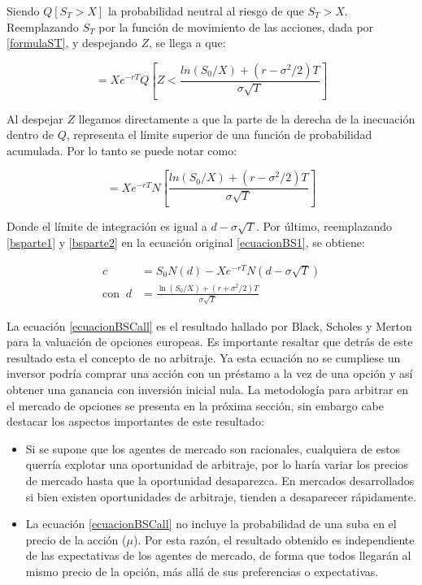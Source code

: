 Siendo $Q[S_T > X]$ la probabilidad neutral al riesgo de que $S_T > X$. Reemplazando $S_T$ por la función de movimiento de las acciones, dada por \eqref{formulaST}, y despejando $Z$, se llega a que:

\[
	= X e^{-rT} Q\left[ Z < \frac{ln(S_0/X) + (r-\sigma^2/2) T}{\sigma \sqrt{T}} \right]
\]

Al despejar $Z$ llegamos directamente a que la parte de la derecha de la inecuación dentro de $Q$, representa el límite superior de una función de probabilidad acumulada. Por lo tanto se puede notar como:

\[
	= X e^{-rT} N\left[ \frac{ln(S_0/X) + (r-\sigma^2/2) T}{\sigma \sqrt{T}} \right] \label{bsparte2}
\]

Donde el límite de integración es igual a $d-\sigma \sqrt{T}$. Por último, reemplazando \eqref{bsparte1} y \eqref{bsparte2} en la ecuación original \eqref{ecuacionBS1}, se obtiene:


\begin{align}
	c &= S_0 N(d) - X e^{-rT} N(d-\sigma \sqrt{T}) \label{ecuacionBSCall}\\
	\mathrm{con}\;\; d &= \frac{\ln(S_0/X) + (r+\sigma^2/2) T}{\sigma \sqrt{T}} \nonumber
\end{align}

La ecuación \eqref{ecuacionBSCall} es el resultado hallado por Black, Scholes y Merton para la valuación de opciones europeas. Es importante resaltar que detrás de este resultado esta el concepto de no arbitraje. Ya esta ecuación no se cumpliese un inversor podría comprar una acción con un préstamo a la vez de una opción y así obtener una ganancia con inversión inicial nula. La metodología para arbitrar en el mercado de opciones se presenta en la próxima sección, sin embargo cabe destacar los aspectos importantes de este resultado:

\begin{itemize}
\item Si se supone que los agentes de mercado son racionales, cualquiera de estos querría explotar una oportunidad de arbitraje, por lo haría variar los precios de mercado hasta que la oportunidad desaparezca. En mercados desarrollados si bien existen oportunidades de arbitraje, tienden a desaparecer rápidamente.
\item La ecuación \eqref{ecuacionBSCall} no incluye la probabilidad de una suba en el precio de la acción ($\mu$). Por esta razón, el resultado obtenido es independiente de las expectativas de los agentes de mercado, de forma que todos llegarán al mismo precio de la opción, más allá de sus preferencias o expectativas.
\end{itemize}

